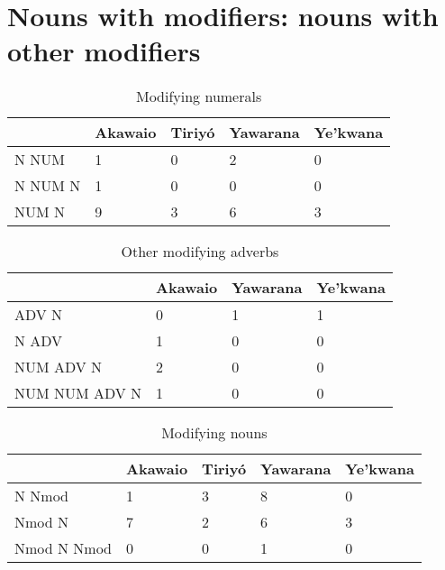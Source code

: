 \documentclass[10pt]{article}
\begin{document}
\section{Nouns with modifiers: nouns with other modifiers}

\begin{table}
\caption{Modifying numerals}
\label{tab:nummod}
\centering
\begin{tabular}{lllll}
\toprule
        & Akawaio & Tiriyó & Yawarana & Ye'kwana \\
\midrule
  N NUM &       1 &      0 &        2 &        0 \\
N NUM N &       1 &      0 &        0 &        0 \\
  NUM N &       9 &      3 &        6 &        3 \\
\bottomrule
\end{tabular}

\end{table}

\begin{table}
\caption{Other modifying adverbs}
\label{tab:advmod}
\centering
\begin{tabular}{llll}
\toprule
              & Akawaio & Yawarana & Ye'kwana \\
\midrule
        ADV N &       0 &        1 &        1 \\
        N ADV &       1 &        0 &        0 \\
    NUM ADV N &       2 &        0 &        0 \\
NUM NUM ADV N &       1 &        0 &        0 \\
\bottomrule
\end{tabular}

\end{table}

\begin{table}
\caption{Modifying nouns}
\label{tab:nmod}
\centering
\begin{tabular}{lllll}
\toprule
            & Akawaio & Tiriyó & Yawarana & Ye'kwana \\
\midrule
     N Nmod &       1 &      3 &        8 &        0 \\
     Nmod N &       7 &      2 &        6 &        3 \\
Nmod N Nmod &       0 &      0 &        1 &        0 \\
\bottomrule
\end{tabular}

\end{table}
\end{document}
